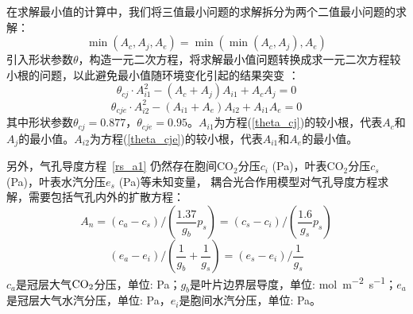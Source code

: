 在求解最小值的计算中，我们将三值最小问题的求解拆分为两个二值最小问题的求解：
\begin{equation}\label{min_Ac_Aj_Ae}
\min \left(A_{c}, A_{j}, A_{e}\right)=\min \left(\min \left(A_{c}, A_{j}\right), A_{e}\right)
\end{equation}
引入形状参数$\theta$，构造一元二次方程，将求解最小值问题转换成求一元二次方程较小根的问题，以此避免最小值随环境变化引起的结果突变 \citep{collatz1991,collatz1992}：
\begin{equation}\label{theta_cj}
\theta_{c j} \cdot A_{i1}^{2}-\left(A_{c}+A_{j}\right) A_{i1}+A_{c} A_{j}=0
\end{equation}
\begin{equation}\label{theta_cje}
\theta_{c j e} \cdot A_{i2}^{2}-\left(A_{i1}+A_{e}\right) A_{i2}+A_{i1} A_{e}=0
\end{equation}
其中形状参数$\theta_{cj}=0.877$，$\theta_{cje}=0.95$。$A_{i1}$为方程(\ref{theta_cj})的较小根，代表$A_c$和$A_j$的最小值。$A_{i2}$为方程(\ref{theta_cje})的较小根，代表$A_{i1}$和$A_e$的最小值。


另外，气孔导度方程~\eqref{rs_a1} 仍然存在胞间CO$_2$分压$c_i$ (Pa)，叶表CO$_2$分压$c_s$ (Pa)，叶表水汽分压$e_s$ (Pa)等未知变量，
耦合光合作用模型对气孔导度方程求解，需要包括气孔内外的扩散方程：
\begin{equation}\label{A_n2}
A_{n}=\left(c_{a}-c_{s}\right) /\left(\frac{1.37}{g_{b}} p_{s}\right)=\left(c_{s}-c_{i}\right) /\left(\frac{1.6}{g_{s}} p_{s}\right)
\end{equation}
\begin{equation}\label{ea_ei}
\left(e_{a}-e_{i}\right) /\left(\frac{1}{g_{b}}+\frac{1}{g_{s}}\right)=\left(e_{s}-e_{i}\right) / \frac{1}{g_{s}}
\end{equation}
$c_a$是冠层大气$\rm CO_2$分压，单位: Pa；$g_b$是叶片边界层导度，单位: \unit{mol.m^{-2}.s^{-1}}；$e_a$是冠层大气水汽分压，单位: Pa，$e_i$是胞间水汽分压，单位: Pa。

